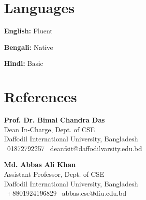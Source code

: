 \documentclass[letterpaper,11pt]{article}
\newcommand{\resumeSubHeadingListStart}{\begin{itemize}[leftmargin=0.15in, label={}]}
\newcommand{\resumeSubHeadingListEnd}{\end{itemize}}
\begin{document}

\section{Languages}
  \vspace{-2pt} %
  \resumeSubHeadingListStart
    \small{\item{
        \textbf{English:}{ Fluent} \\ \vspace{1pt} %
        
        \textbf{Bengali:}{ Native} \\ \vspace{1pt} %
        
        \textbf{Hindi:}{ Basic}
    }}
  \resumeSubHeadingListEnd




\section{References}
  \vspace{-2pt} %
  \noindent
  \begin{minipage}[t]{0.48\textwidth}
    \small{
        \textbf{Prof. Dr. Bimal Chandra Das} \\
        Dean In-Charge, Dept. of CSE \\
        Daffodil International University, Bangladesh \\
        \faPhone\ 01872792257 \quad \faAt\ deanfsit@daffodilvarsity.edu.bd
    }
  \end{minipage}
  \hfill
  \begin{minipage}[t]{0.48\textwidth}
    \small{
        \textbf{Md. Abbas Ali Khan} \\
        Assistant Professor, Dept. of CSE \\
        Daffodil International University, Bangladesh \\
        \faPhone\ +8801924196829 \quad \faAt\ abbas.cse@diu.edu.bd
    }
  \end{minipage}



\end{document}
